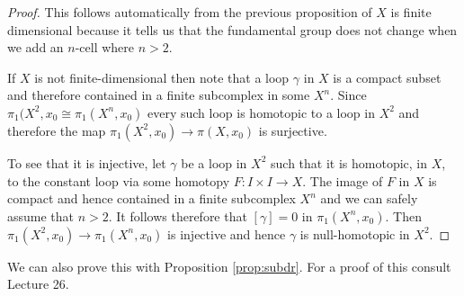 \documentclass[11pt]{article}
\begin{document}
\begin{proof}
This follows automatically from the previous proposition of $X$ is finite dimensional because it tells us that the fundamental group does not change when we add an $n$-cell where $n>2$.

If $X$ is not finite-dimensional then note that a loop $\gamma$ in $X$ is a compact subset and therefore contained in a finite subcomplex in some $X^n$. Since $\pi_1(X^2, x_0\cong \pi_1(X^n, x_0)$ every such loop is homotopic to a loop in $X^2$ and therefore the map $\pi_1(X^2, x_0)\to \pi(X, x_0)$ is surjective.

To see that it is injective, let $\gamma$ be a loop in $X^2$ such that it is homotopic, in $X$, to the constant loop via some homotopy $F:I\times I \to X$.
The image of $F$ in $X$ is compact and hence contained in a finite subcomplex $X^n$ and we can safely assume that $n>2$.
It follows therefore that $\left[\gamma\right]=0$ in $\pi_1(X^n, x_0)$.
Then $\pi_1(X^2, x_0)\to\pi_1(X^n, x_0)$ is injective and hence $\gamma$ is null-homotopic in $X^2$.
\end{proof}

We can also prove this with Proposition \ref{prop:subdr}.
For a proof of this consult Lecture 26.
\end{document}
